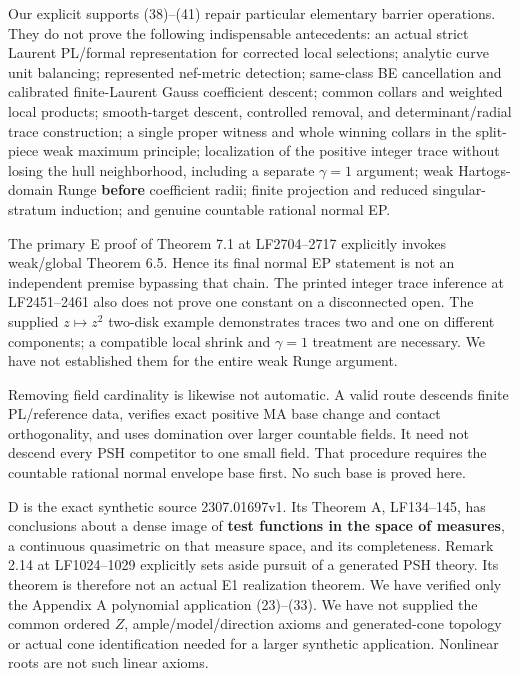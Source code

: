 \documentclass[
  10pt,
]{article}
\begin{document}
Our explicit supports (38)--(41) repair particular elementary barrier
operations. They do not prove the following indispensable antecedents:
an actual strict Laurent PL/formal representation for corrected local
selections; analytic curve unit balancing; represented nef-metric
detection; same-class BE cancellation and calibrated finite-Laurent
Gauss coefficient descent; common collars and weighted local products;
smooth-target descent, controlled removal, and determinant/radial trace
construction; a single proper witness and whole winning collars in the
split-piece weak maximum principle; localization of the positive integer
trace without losing the hull neighborhood, including a separate
\(\gamma=1\) argument; weak Hartogs-domain Runge \textbf{before}
coefficient radii; finite projection and reduced singular-stratum
induction; and genuine countable rational normal EP.

The primary E proof of Theorem 7.1 at LF2704--2717 explicitly invokes
weak/global Theorem 6.5. Hence its final normal EP statement is not an
independent premise bypassing that chain. The printed integer trace
inference at LF2451--2461 also does not prove one constant on a
disconnected open. The supplied \(z\mapsto z^2\) two-disk example
demonstrates traces two and one on different components; a compatible
local shrink and \(\gamma=1\) treatment are necessary. We have not
established them for the entire weak Runge argument.

Removing field cardinality is likewise not automatic. A valid route
descends finite PL/reference data, verifies exact positive MA base
change and contact orthogonality, and uses domination over larger
countable fields. It need not descend every PSH competitor to one small
field. That procedure requires the countable rational normal envelope
base first. No such base is proved here.

D is the exact synthetic source 2307.01697v1. Its Theorem A, LF134--145,
has conclusions about a dense image of \textbf{test functions in the
space of measures}, a continuous quasimetric on that measure space, and
its completeness. Remark 2.14 at LF1024--1029 explicitly sets aside
pursuit of a generated PSH theory. Its theorem is therefore not an
actual E1 realization theorem. We have verified only the Appendix A
polynomial application (23)--(33). We have not supplied the common
ordered \(Z\), ample/model/direction axioms and generated-cone topology
or actual cone identification needed for a larger synthetic application.
Nonlinear roots are not such linear axioms.
\end{document}
